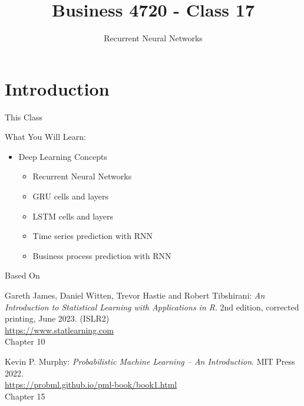 \documentclass[ignorenonframetext,xcolor=x11names]{beamer}
\title{Business 4720 - Class 17}
\subtitle{Recurrent Neural Networks}
\begin{document}
\begin{frame}[label=full]{}
  \titlepage
  \footnotesize
  
\end{frame}

\section{Introduction}

\begin{frame}[label=full]{This Class}

\begin{block}{What You Will Learn:}
\begin{itemize}
  \item Deep Learning Concepts
  \begin{itemize}
     \item Recurrent Neural Networks
     \item GRU cells and layers
     \item LSTM cells and layers
     \item Time series prediction with RNN
     \item Business process prediction with RNN
  \end{itemize}
\end{itemize}
\end{block}
\end{frame}

\begin{frame}[label=full]{Based On}
\begin{block}{}
Gareth James, Daniel Witten, Trevor Hastie and Robert Tibshirani: \emph{An Introduction to Statistical Learning with Applications in R}. 2nd edition, corrected printing, June 2023. (ISLR2) \\
\vspace{0.5\baselineskip}
\url{https://www.statlearning.com} \\
\vspace{0.5\baselineskip}
Chapter 10
\end{block}

\begin{block}{}
Kevin P. Murphy: \emph{Probabilistic Machine Learning -- An Introduction}. MIT Press 2022. \\
\vspace{0.5\baselineskip}
\url{https://probml.github.io/pml-book/book1.html} \\
\vspace{0.5\baselineskip}
Chapter 15
\end{block}
\end{frame}
\end{document}
